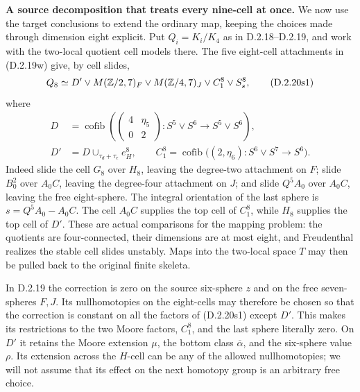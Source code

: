 \medskip\noindent
\textbf{A source decomposition that treats every nine-cell at once.}
We now use the target conclusions to extend the ordinary map,
keeping the choices made through dimension eight explicit.
Put $Q_i=K_i/K_4$ as in D.2.18--D.2.19, and work with the
two-local quotient cell models there. The five eight-cell
attachments in \textup{(D.2.19w)} give, by cell slides,
\[
 Q_8\simeq D'\vee M(\mathbb Z/2,7)_F\vee M(\mathbb Z/4,7)_J
                  \vee C_1^8\vee S^8_s,
 \tag{D.2.20s1}
\]
where
\[
\begin{split}
 D&=\operatorname{cofib}\left(
  \begin{pmatrix}4&\eta_5\\0&2\end{pmatrix}:
  S^5\vee S^6\longrightarrow S^5\vee S^6\right),\\
 D'&=D\cup_{\tau_d+\tau_e}e^8_H,\qquad
 C_1^8=\operatorname{cofib}\bigl((2,\eta_6):S^6\vee S^7\to S^6\bigr).
\end{split}
 \tag{D.2.20s2}
\]
Indeed slide the cell $G_8$ over $H_8$, leaving the
degree-two attachment on $F$; slide $B_0^2$ over $A_0C$,
leaving the degree-four attachment on $J$; and slide
$Q^5A_0$ over $A_0C$, leaving the free eight-sphere.
The integral orientation of the last sphere is
$s=Q^5A_0-A_0C$. The cell $A_0C$ supplies the top
cell of $C_1^8$, while $H_8$ supplies the top cell of $D'$.
These are actual comparisons for the mapping problem:
the quotients are four-connected, their dimensions are
at most eight, and Freudenthal realizes the stable cell
slides unstably. Maps into the two-local space $T$ may
then be pulled back to the original finite skeleta.

In D.2.19 the correction is zero on the source six-sphere
$z$ and on the free seven-spheres $F,J$. Its nullhomotopies
on the eight-cells may therefore be chosen so that the
correction is constant on all the factors of
\textup{(D.2.20s1)} except $D'$. This makes its restrictions
to the two Moore factors, $C_1^8$, and the last sphere
literally zero. On $D'$ it retains the Moore extension
$\mu$, the bottom class $\overline\alpha$, and the
six-sphere value $\rho$. Its extension across the
$H$-cell can be any of the allowed nullhomotopies;
we will not assume that its effect on the next
homotopy group is an arbitrary free choice.

